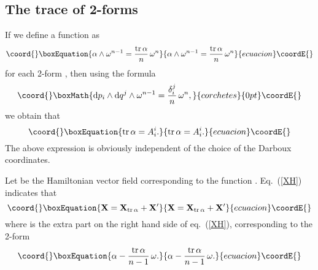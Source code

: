 \documentclass[12pt,a4paper]{article}
\providecommand{\dd}{\mathrm{d}}
\providecommand{\vect}{\mathbf}
\providecommand{\tr}{\mathrm{tr\,}}
\providecommand{\comments}[1]{{}}
\begin{document}
\subsection{The trace of 2-forms}

If we define a function \myHighlight{$\tr\alpha$}\coordHE{} as
\begin{equation}\coord{}\boxEquation{
  \alpha\wedge\omega^{n-1} = \frac{\tr\alpha}{n} \,\omega^n
}{
  \alpha\wedge\omega^{n-1} = \frac{\tr\alpha}{n} \,\omega^n
}{ecuacion}\coordE{}\end{equation}
for each 2-form \myHighlight{$\alpha$}\coordHE{}, then using the formula
\begin{displaymath}\coord{}\boxMath{
  \dd p_i\wedge\dd q^j\wedge\omega^{n-1} = \frac{\delta^j_i}{n}\,\omega^n,
}{corchetes}{0pt}\coordE{}\end{displaymath}
we obtain that
\begin{equation}\coord{}\boxEquation{
  \tr\alpha = A^i_i.
}{
  \tr\alpha = A^i_i.
}{ecuacion}\coordE{}\end{equation}
The above expression is obviously independent of the choice of
the Darboux
coordinates.

Let \myHighlight{$\vect{X}_{\tr\alpha}$}\coordHE{} be the Hamiltonian vector field
corresponding to the function \myHighlight{$\tr\alpha$}\coordHE{}. Eq.~(\ref{XH})
indicates that
\begin{equation}\coord{}\boxEquation{
  \vect{X} = \vect{X}_{\tr\alpha} + \vect{X}'
}{
  \vect{X} = \vect{X}_{\tr\alpha} + \vect{X}'
}{ecuacion}\coordE{}\end{equation}
where \myHighlight{$\vect{X}'$}\coordHE{} is the extra part on the right hand side of
eq.~(\ref{XH}), corresponding to the 2-form
\begin{equation}\coord{}\boxEquation{
  \alpha - \frac{\tr\alpha}{n - 1}\,\omega.
}{
  \alpha - \frac{\tr\alpha}{n - 1}\,\omega.
}{ecuacion}\coordE{}\end{equation}
\comments{  %
Hence, when the 2-form \myHighlight{$\alpha = \frac{H}{n-1}\,\omega$}\coordHE{} with \myHighlight{$H$}\coordHE{}
a function on
\myHighlight{$\mathcal{M}$}\coordHE{}, \myHighlight{$\tr\alpha = \frac{n}{n-1}\,H$}\coordHE{} and the traceless
part of
\myHighlight{$\alpha$}\coordHE{} vanishes.
}  %
\end{document}
